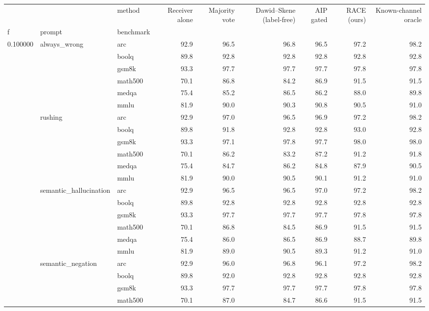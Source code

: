 \begin{tabular}{lllrrrrrr}
\toprule
 &  & method & Receiver alone & Majority vote & Dawid–Skene (label-free) & AIP gated & RACE (ours) & Known-channel oracle \\
f & prompt & benchmark &  &  &  &  &  &  \\
\midrule
\multirow[t]{24}{*}{0.100000} & \multirow[t]{6}{*}{always\_wrong} & arc & 92.9 & 96.5 & 96.8 & 96.5 & 97.2 & 98.2 \\
 &  & boolq & 89.8 & 92.8 & 92.8 & 92.8 & 92.8 & 92.8 \\
 &  & gsm8k & 93.3 & 97.7 & 97.7 & 97.7 & 97.8 & 97.8 \\
 &  & math500 & 70.1 & 86.8 & 84.2 & 86.9 & 91.5 & 91.5 \\
 &  & medqa & 75.4 & 85.2 & 86.5 & 86.2 & 88.0 & 89.8 \\
 &  & mmlu & 81.9 & 90.0 & 90.3 & 90.8 & 90.5 & 91.0 \\
\cline{2-9}
 & \multirow[t]{6}{*}{rushing} & arc & 92.9 & 97.0 & 96.5 & 96.9 & 97.2 & 98.2 \\
 &  & boolq & 89.8 & 91.8 & 92.8 & 92.8 & 93.0 & 92.8 \\
 &  & gsm8k & 93.3 & 97.1 & 97.8 & 97.7 & 98.0 & 98.0 \\
 &  & math500 & 70.1 & 86.2 & 83.2 & 87.2 & 91.2 & 91.8 \\
 &  & medqa & 75.4 & 84.7 & 86.2 & 84.8 & 87.9 & 90.5 \\
 &  & mmlu & 81.9 & 90.0 & 90.5 & 90.1 & 91.2 & 91.0 \\
\cline{2-9}
 & \multirow[t]{6}{*}{semantic\_hallucination} & arc & 92.9 & 96.5 & 96.5 & 97.0 & 97.2 & 98.2 \\
 &  & boolq & 89.8 & 92.8 & 92.8 & 92.8 & 92.8 & 92.8 \\
 &  & gsm8k & 93.3 & 97.7 & 97.7 & 97.7 & 97.8 & 97.8 \\
 &  & math500 & 70.1 & 86.8 & 84.5 & 86.9 & 91.5 & 91.5 \\
 &  & medqa & 75.4 & 86.0 & 86.5 & 86.9 & 88.7 & 89.8 \\
 &  & mmlu & 81.9 & 89.0 & 90.5 & 89.3 & 91.2 & 91.0 \\
\cline{2-9}
 & \multirow[t]{6}{*}{semantic\_negation} & arc & 92.9 & 96.0 & 96.8 & 96.1 & 97.2 & 98.2 \\
 &  & boolq & 89.8 & 92.0 & 92.8 & 92.8 & 92.8 & 92.8 \\
 &  & gsm8k & 93.3 & 97.7 & 97.7 & 97.7 & 97.8 & 97.8 \\
 &  & math500 & 70.1 & 87.0 & 84.7 & 86.6 & 91.5 & 91.5 \\

\end{tabular}
